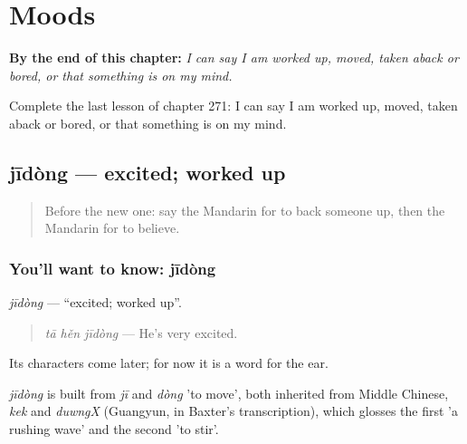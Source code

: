 
\chapter{Moods}
\label{ch:zh-moods}

\begin{chapteropening}
\textbf{By the end of this chapter:} \emph{I can say I am worked up, moved, taken aback or bored, or that something is on my mind.}

Complete the last lesson of chapter 271: I can say I am worked up, moved, taken aback or bored, or that something is on my mind.
\end{chapteropening}

\section[jīdòng]{jīdòng — excited; worked up}

\label{lesson:ZH-C271-jidong}



\begin{quote}
Before the new one: say the Mandarin for to back someone up, then the Mandarin for to believe.
\end{quote}

\subsection*{You'll want to know: jīdòng}
\emph{jīdòng} — \textquotedblleft{}excited; worked up\textquotedblright{}.

\begin{quote}
\emph{tā hěn jīdòng} — He's very excited.
\end{quote}

Its characters come later; for now it is a word for the ear.

\begin{cousinweb}
\emph{jīdòng} is built from \emph{jī} and \emph{dòng} 'to move', both inherited from Middle Chinese, \emph{kek} and \emph{duwngX} (Guangyun, in Baxter's transcription), which glosses the first 'a rushing wave' and the second 'to stir'.
\end{cousinweb}

